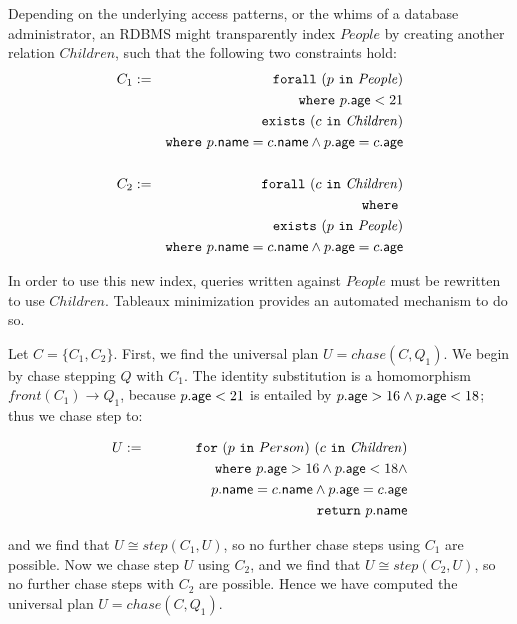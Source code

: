 \documentclass[preprint]{sigplanconf}
\newcommand{\FOR}{{\tt for} \ }
\newcommand{\FORALL}{{\tt forall} \ }
\newcommand{\EXISTS}{{\tt exists} \ }
\newcommand{\WHERE}{{\tt where} \ }
\newcommand{\IN}{ \ {\tt in} \ }
\newcommand{\RETURN}{{\tt return} \ }
\newcommand{\relation}[1]{\ensuremath{\mathit{#1}}\xspace}
\begin{document}
Depending on the underlying access patterns, or the whims of a database administrator, an RDBMS might transparently index \relation{People} by creating another relation \relation{Children}, such that the following two constraints hold:
\begin{eqnarray*}
C_1 & := & \FORALL (p \IN \relation{People}) \\
 & & \WHERE p.{\sf age} < 21 \\
 & & \EXISTS (c \IN \relation{Children}) \\
 & & \WHERE p.{\sf name} = c.{\sf name} \wedge p.{\sf age} = c.{\sf age}  \\
 & & \\
  C_2 & := & \FORALL (c \IN \relation{Children}) \\
  & & \WHERE \\
 & & \EXISTS (p \IN \relation{People}) \\
 & & \WHERE p.{\sf name} = c.{\sf name} \wedge p.{\sf age} = c.{\sf age}
\end{eqnarray*}

In order to use this new index, queries written against \relation{People} must be rewritten to use \relation{Children}.
Tableaux minimization provides an automated mechanism to do so.

Let $C = \{ C_1, C_2\}$.  First, we find the universal plan $U = chase(C, Q_1)$.  We begin by chase stepping $Q$ with $C_1$.  The identity substitution is a homomorphism $front(C_1) \to Q_1$, because $p.{\sf age} < 21$ is entailed by $p.{\sf age} > 16 \wedge p.{\sf age} < 18$; thus we chase step to:
\begin{normalsize}
\begin{eqnarray*}
U & := & \FOR (p \IN Person) \ (c \IN \relation{Children}) \\
 & & \WHERE p.{\sf age} > 16 \wedge p.{\sf age} < 18 \wedge \\
 & & \ \ \ \ \ \ \ \ \ \ \ \ p.{\sf name} = c.{\sf name} \wedge p.{\sf age} = c.{\sf age} \\
 & & \RETURN p.{\sf name}
\end{eqnarray*}  
\end{normalsize}
and we find that $U \cong step(C_1, U)$, so no further chase steps using $C_1$ are possible.  Now we chase step $U$ using $C_2$, and we find that $U \cong step(C_2, U)$, so no further chase steps with $C_2$ are possible.  Hence we have computed the universal plan $U = chase(C,Q_1)$.
\end{document}
